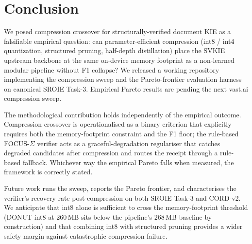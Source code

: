 \section{Conclusion}
\label{sec:conclusion}

We posed compression crossover for structurally-verified document
KIE as a falsifiable empirical question: can parameter-efficient
compression (int8 / int4 quantization, structured pruning,
half-depth distillation) place the SVKIE upstream backbone at the
same on-device memory footprint as a non-learned modular pipeline
without F1 collapse?  We released a working repository implementing
the compression sweep and the Pareto-frontier evaluation harness on
canonical SROIE Task-3.  Empirical Pareto results are pending the
next vast.ai compression sweep.

The methodological contribution holds independently of the
empirical outcome.  Compression crossover is operationalised as a
binary criterion that explicitly requires both the memory-footprint
constraint and the F1 floor; the rule-based FOCUS-$\Sigma$ verifier
acts as a graceful-degradation regulariser that catches degraded
candidates after compression and routes the receipt through a
rule-based fallback.  Whichever way the empirical Pareto falls when
measured, the framework is correctly stated.

Future work runs the sweep, reports the Pareto frontier, and
characterises the verifier's recovery rate post-compression on
both SROIE Task-3 and CORD-v2.  We anticipate that int8 alone is
sufficient to cross the memory-footprint threshold (DONUT int8 at
260\,MB sits below the pipeline's 268\,MB baseline by construction)
and that combining int8 with structured pruning provides a wider
safety margin against catastrophic compression failure.
